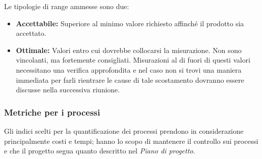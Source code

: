 \documentclass[a4paper]{article}
\begin{document}
			Le tipologie di range ammesse sono due:
			\begin{itemize}
				\item \textbf{Accettabile:} Superiore al minimo valore richiesto affinché il prodotto sia accettato.
				\item \textbf{Ottimale:} Valori entro cui dovrebbe collocarsi la misurazione. Non sono vincolanti,
				ma fortemente consigliati. Misurazioni al di fuori di questi valori necessitano una verifica approfondita e nel
				caso non si trovi una maniera immediata per farli rientrare le cause di tale scostamento dovranno essere
				discusse nella successiva riunione.
			\end{itemize}
			\subsubsection{Metriche per i processi}
				Gli indici scelti per la quantificazione dei processi prendono in considerazione principalmente costi e tempi;
				hanno lo scopo di mantenere il controllo sui processi e che il progetto segua quanto descritto nel \emph{Piano di
				progetto}.
				
\end{document}
